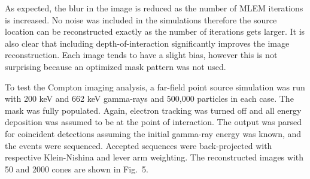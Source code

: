 \documentclass[10pt]{article}
\begin{document}
As expected, the blur in the image is reduced as the number of MLEM iterations is increased. No noise was included in the simulations therefore the source location can be reconstructed exactly as the number of iterations gets larger. It is also clear that including depth-of-interaction significantly improves the image reconstruction. Each image tends to have a slight bias, however this is not surprising because an optimized mask pattern was not used. 

To test the Compton imaging analysis, a far-field point source simulation was run with 200 keV and 662 keV gamma-rays and 500,000 particles in each case. The mask was fully populated. Again, electron tracking was turned off and all energy deposition was assumed to be at the point of interaction. The output was parsed for coincident detections assuming the initial gamma-ray energy was known, and the events were sequenced. Accepted sequences were back-projected with respective Klein-Nishina and lever arm weighting. The reconstructed images with 50 and 2000 cones are shown in Fig.~5. 
\end{document}
